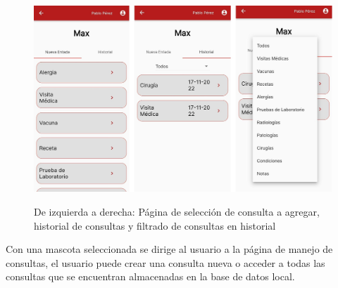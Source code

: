 \begin{figure}[h!]
\begin{center}
\includegraphics[scale=0.17]{Graphics/images/hcvet/formsmake.jpg}
\label{fig:bac}
\caption{De izquierda a derecha: Página de selección de consulta a agregar, historial de consultas y filtrado de consultas en historial}
\end{center}
\end{figure}

Con una mascota seleccionada se dirige al usuario a la página de manejo de consultas, el usuario puede crear una consulta nueva o acceder a todas las consultas que se encuentran almacenadas en la base de datos local.
